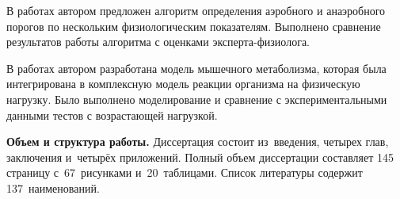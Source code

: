В работах \cite{GolovIt2017,GolovSp2016, TimmeSp2016} автором предложен алгоритм определения аэробного и анаэробного порогов по нескольким физиологическим показателям. Выполнено сравнение результатов работы алгоритма с оценками эксперта-физиолога.

В работах \cite{GolovSp2015,GolovEkb2016} автором разработана модель мышечного метаболизма, которая была интегрирована в комплексную модель реакции организма на физическую нагрузку. Было выполнено моделирование и сравнение с экспериментальными данными тестов с возрастающей нагрузкой.

\textbf{Объем и структура работы.} Диссертация состоит из~введения, четырех глав, заключения и~четырёх приложений. Полный объем диссертации составляет 145 страницу с~67~рисунками и~20~таблицами. Список литературы содержит 137~наименований.

\clearpage